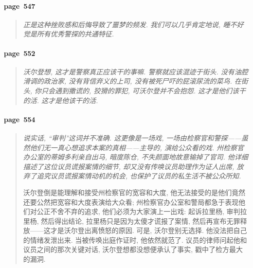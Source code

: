 \paragraph*{page~547}
\begin{quotation}
    \itshape
    正是这种挫败感和后悔导致了噩梦的频发. 我们可以几乎肯定地说, 睡不好觉是所有优秀警探的共通特征. 
\end{quotation}

\paragraph*{page~552}
\begin{quotation}
    \itshape
    沃尔登想, 这才是警察真正应该干的事嘛. 警察就应该混迹于街头. 没有油腔滑调的政治家, 没有背信弃义的上司, 没有被死尸吓的屁滚尿流的菜鸟. 在街头, 你只会遇到撒谎的, 狡猾的罪犯, 可沃尔登并不会抱怨. 这才是他们该干的活. 这才是他该干的活. 
\end{quotation}

\newpage
\paragraph*{page~554}
\begin{quotation}
    \itshape
    说实话, ``审判''这词并不准确. 这更像是一场戏, 一场由检察官和警探------虽然他们无一真心想追求本案的真相------主导的, 演给公众看的戏. 州检察官办公室的蒂姆多利亲自出马, 暗度陈仓, 不失颜面地故意输掉了官司. 他详细描述了这位议员谎报案情的细节, 却又没有传唤议员助理作为证人出席, 放弃了追究议员谎报案情动机的机会, 也保护了议员的私生活不被公众所知.

    沃尔登倒是能理解和接受州检察官的宽容和大度, 他无法接受的是他们竟然还要公然把宽容和大度表演给大众看; 州检察官办公室和警局都急于表现他们对公正不舍不弃的追求, 他们必须为大家演上一出戏: 起诉拉里杨, 审判拉里杨, 然后得出结论, 拉里杨只是因为太傻才谎报了案情, 然后再宣布无罪释放------这才是沃尔登出离愤怒的原因. 可是, 沃尔登别无选择. 他没法把自己的情绪发泄出来. 当被传唤出庭作证时, 他依然就范了. 议员的律师问起他和议员之间的那次关键对话, 沃尔登想都没想便承认了事实, 戳中了检方最大的漏洞.  
\end{quotation}

